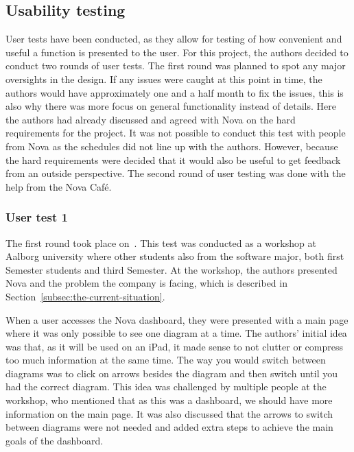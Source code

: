 \subsection{Usability testing}\label{subsec:usability-tests}
User tests have been conducted, as they allow for testing of how convenient
and useful a function is presented to the user.
For this project, the authors decided to conduct two rounds of user tests.
The first round was planned to spot any major oversights in the design.
If any issues were caught at this point in time, the authors would have approximately one and a half month
to fix the issues, this is also why there was more focus on general functionality instead of details.
Here the authors had already discussed and agreed with Nova on the hard requirements for the project.
It was not possible to conduct this test with people from Nova as the schedules did not line up with the authors.
However, because the hard requirements were decided that it would also be useful to get feedback
from an outside perspective.
The second round of user testing was done with the help from the Nova Café.

\subsubsection{User test 1}\label{subsubsec:user-test-1}
The first round took place on~.
This test was conducted as a workshop at Aalborg university where other students also from the software major,
both first Semester students and third Semester.
At the workshop, the authors presented Nova and the problem the company is facing, which is described in
Section~\ref{subsec:the-current-situation}.

When a user accesses the Nova dashboard, they were presented with a main page where it was only possible to see
one diagram at a time.
The authors' initial idea was that, as it will be used on an iPad, it made sense to not clutter or compress too
much information at the same time.
The way you would switch between diagrams was to click on arrows besides the diagram and then switch until you had
the correct diagram.
This idea was challenged by multiple people at the workshop, who mentioned that as this was a dashboard, we should
have more information on the main page.
It was also discussed that the arrows to switch between diagrams were not needed and added extra steps to achieve
the main goals of the dashboard.

